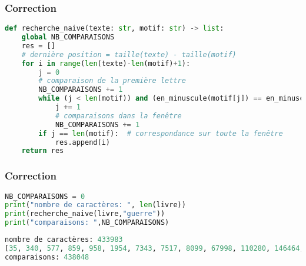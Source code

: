 \documentclass[svgnames,11pt]{beamer}
\begin{document}
\begin{frame}[fragile]
    \frametitle{Correction}

    \begin{center}
    \begin{lstlisting}[language=Python , basicstyle=\small, xleftmargin=0.2em, xrightmargin=0.2em]
def recherche_naive(texte: str, motif: str) -> list:
    global NB_COMPARAISONS
    res = []
    # dernière position = taille(texte) - taille(motif)
    for i in range(len(texte)-len(motif)+1):
        j = 0
        # comparaison de la première lettre
        NB_COMPARAISONS += 1
        while (j < len(motif)) and (en_minuscule(motif[j]) == en_minuscule(texte[i+j])):
            j += 1
            # comparaisons dans la fenêtre
            NB_COMPARAISONS += 1        
        if j == len(motif):  # correspondance sur toute la fenêtre
            res.append(i)
    return res
\end{lstlisting}
    \label{CODE}
    \end{center}

\end{frame}
\begin{frame}[fragile]
    \frametitle{Correction}

    \begin{center}
    \begin{lstlisting}[language=Python , basicstyle=\small, xleftmargin=2em, xrightmargin=2em]
NB_COMPARAISONS = 0
print("nombre de caractères: ", len(livre))
print(recherche_naive(livre,"guerre"))
print("comparaisons: ",NB_COMPARAISONS)
\end{lstlisting}
    \end{center}
\begin{center}
\begin{lstlisting}[language=Python , basicstyle=\small, xleftmargin=2em, xrightmargin=2em]
nombre de caractères: 433983
[35, 340, 577, 859, 958, 1954, 7343, 7517, 8099, 67998, 110280, 146464, 229890, 241073, 264650, 272295, 326198, 333691, 333738, 333770, 334412, 372834, 376022, 392191, 393202, 401899, 415041, 415120]
comparaisons: 438048
\end{lstlisting}
\label{CODE}
\end{center}
\end{frame}
\end{document}

